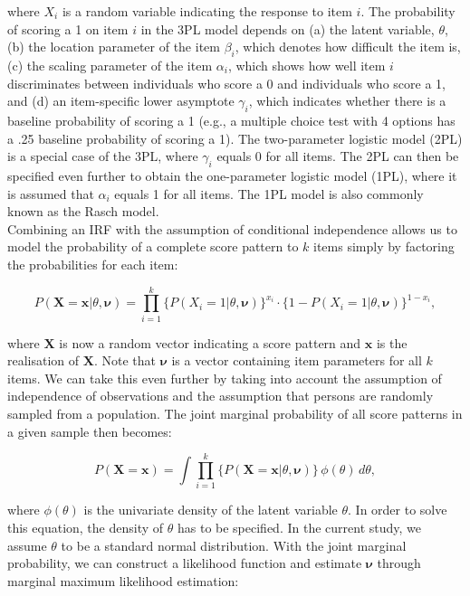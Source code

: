 \documentclass[Royal,sageapa,times,doublespace]{sagej}
\begin{document}
where $X_i$ is a random variable indicating the response to item $i$. The probability of scoring a 1 on item $i$ in the 3PL model depends on (a) the latent variable, $\theta$, (b) the location parameter of the item $\beta_{i}$, which denotes how difficult the item is, (c) the scaling parameter of the item $\alpha_{i}$, which shows how well item $i$ discriminates between individuals who score a 0 and individuals who score a 1, and (d) an item-specific lower asymptote $\gamma_{i}$, which indicates whether there is a baseline probability of scoring a 1 (e.g., a multiple choice test with 4 options has a .25 baseline probability of scoring a 1). The two-parameter logistic model (2PL) is a special case of the 3PL, where $\gamma_{i}$ equals 0 for all items. The 2PL can then be specified even further to obtain the one-parameter logistic model (1PL), where it is assumed that $\alpha_{i}$ equals 1 for all items. The 1PL model is also commonly known as the Rasch model. \\
\indent Combining an IRF with the assumption of conditional independence allows us to model the probability of a complete score pattern to $k$ items simply by factoring the probabilities for each item:

\begin{equation}
P(\boldsymbol{X} = \boldsymbol{x} | \theta, \boldsymbol{\nu}) = \prod_{i=1}^{k} \{P(X_i = 1 | \theta, \boldsymbol{\nu})\}^{x_i} \cdot  \{1 - P(X_i = 1 | \theta, \boldsymbol{\nu}) \}^{1 - x_i},
\end{equation}

where $\boldsymbol{X}$ is now a random vector indicating a score pattern and $\boldsymbol{x}$ is the realisation of $\boldsymbol{X}$. Note that $\boldsymbol{\nu}$ is a vector containing item parameters for all $k$ items. We can take this even further by taking into account the assumption of independence of observations and the assumption that persons are randomly sampled from a population. The joint marginal probability of all score patterns in a given sample then becomes:

\begin{equation}
P(\boldsymbol{X} = \boldsymbol{x}) = \int \prod_{i=1}^{k} \{ P(\boldsymbol{X} = \boldsymbol{x} | \theta, \boldsymbol{\nu}) \} \,\phi(\theta)\,d\theta,
\end{equation}

where $\phi(\theta)$ is the univariate density of the latent variable $\theta$. In order to solve this equation, the density of $\theta$ has to be specified. In the current study, we assume $\theta$ to be a standard normal distribution. With the joint marginal probability, we can construct a likelihood function and estimate $\boldsymbol{\nu}$ through marginal maximum likelihood estimation:
\end{document}
